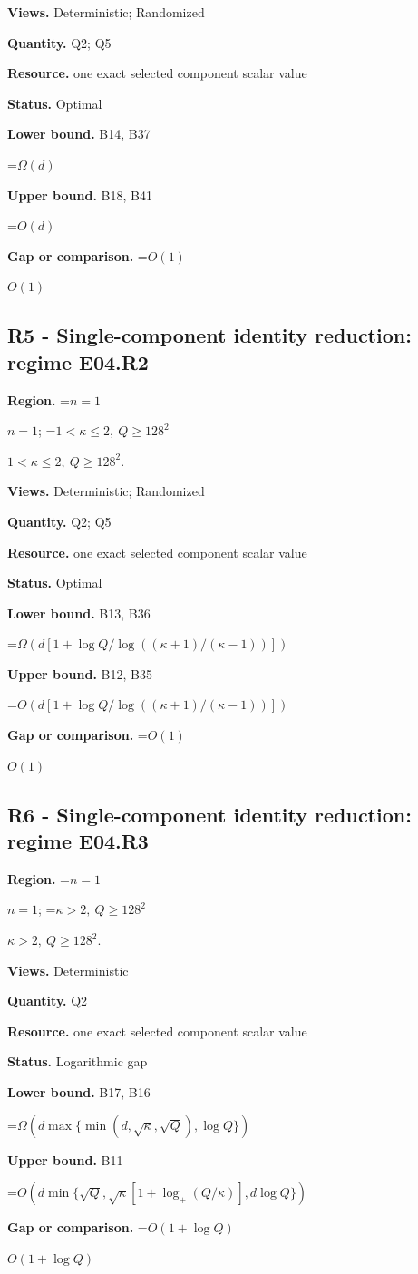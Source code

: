 \documentclass[10pt,a4paper]{article}
\newcommand{\AtlasMath}[1]{\par\begingroup\centering\setbox0=\hbox{$\displaystyle #1$}\ifdim\wd0>1.4\linewidth\typeout{ATLAS WIDE FORMULA: \the\wd0}\fi\ifdim\wd0>\linewidth\resizebox{\linewidth}{!}{\box0}\else\box0\fi\par\endgroup}
\newcommand{\AtlasInlineMath}[1]{\begingroup\setbox0=\hbox{$#1$}\ifdim\wd0>.4\linewidth\endgroup\AtlasMath{#1}\else\endgroup$#1$\fi}
\begin{document}
\textbf{Views.} Deterministic; Randomized

\textbf{Quantity.} Q2; Q5

\textbf{Resource.} one exact selected component scalar value

\textbf{Status.} Optimal

\textbf{Lower bound.} B14, B37

\AtlasMath{\Omega(d)}
\textbf{Upper bound.} B18, B41

\AtlasMath{O(d)}
\textbf{Gap or comparison.} \AtlasInlineMath{O(1)}

\subsection{R5 - Single-component identity reduction: regime E04.R2}
\textbf{Region.} \AtlasInlineMath{n=1}; \AtlasInlineMath{1<\kappa\le2,\ Q\ge128^2}.

\textbf{Views.} Deterministic; Randomized

\textbf{Quantity.} Q2; Q5

\textbf{Resource.} one exact selected component scalar value

\textbf{Status.} Optimal

\textbf{Lower bound.} B13, B36

\AtlasMath{\Omega(d[1+\log Q/\log((\kappa+1)/(\kappa-1))])}
\textbf{Upper bound.} B12, B35

\AtlasMath{O(d[1+\log Q/\log((\kappa+1)/(\kappa-1))])}
\textbf{Gap or comparison.} \AtlasInlineMath{O(1)}

\subsection{R6 - Single-component identity reduction: regime E04.R3}
\textbf{Region.} \AtlasInlineMath{n=1}; \AtlasInlineMath{\kappa>2,\ Q\ge128^2}.

\textbf{Views.} Deterministic

\textbf{Quantity.} Q2

\textbf{Resource.} one exact selected component scalar value

\textbf{Status.} Logarithmic gap

\textbf{Lower bound.} B17, B16

\AtlasMath{\Omega\!\left(d\max\{\min(d,\sqrt\kappa,\sqrt Q),\log Q\}\right)}
\textbf{Upper bound.} B11

\AtlasMath{O(d\min\{\sqrt Q,\sqrt\kappa[1+\log_+(Q/\kappa)],d\log Q\})}
\textbf{Gap or comparison.} \AtlasInlineMath{O(1+\log Q)}
\end{document}
